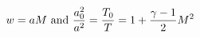 \documentclass[10pt]{article}
\begin{document}
\begin{align*}w=aM \ {\rm and} \
\frac{a_{0}^{2}}{a^{2}}
=
\frac{T_{0}}{T}
=
1 + \frac{\gamma-1}{2} M^2\end{align*}
\end{document}
